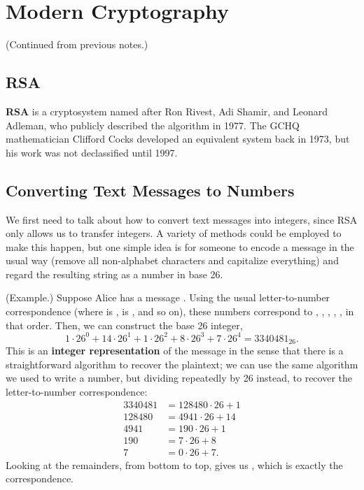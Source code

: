 \documentclass[letterpaper]{article}
\begin{document}
\section{Modern Cryptography}
(Continued from previous notes.)

\subsection{RSA}
\textbf{RSA} is a cryptosystem named after Ron Rivest, Adi Shamir, and Leonard Adleman, who publicly described the algorithm in 1977. The GCHQ mathematician Clifford Cocks developed an equivalent system back in 1973, but his work was not declassified until 1997.

\subsection{Converting Text Messages to Numbers}
We first need to talk about how to convert text messages into integers, since RSA only allows us to transfer integers. A variety of methods could be employed to make this happen, but one simple idea is for someone to encode a message in the usual way (remove all non-alphabet characters and capitalize everything) and regard the resulting string as a number in base 26. 

\begin{mdframed}
    (Example.) Suppose Alice has a message . Using the usual letter-to-number correspondence (where  is ,  is , and so on), these numbers correspond to , , , , , in that order. Then, we can construct the base 26 integer, \[1 \cdot 26^0 + 14 \cdot 26^1 + 1 \cdot 26^2 + 8 \cdot 26^3 + 7 \cdot 26^4 = 3340481_{26}.\]
    This is an \textbf{integer representation} of the message  in the sense that there is a straightforward algorithm to recover the plaintext; we can use the same algorithm we used to write a number, but dividing repeatedly by 26 instead, to recover the letter-to-number correspondence: 
    \begin{equation*}
        \begin{aligned}
            3340481 &= 128480 \cdot 26 + 1 \\ 
            128480 &= 4941 \cdot 26 + 14 \\ 
            4941 &= 190 \cdot 26 + 1 \\ 
            190 &= 7 \cdot 26 + 8 \\ 
            7 &= 0 \cdot 26 + 7.
        \end{aligned}
    \end{equation*}
    Looking at the remainders, from bottom to top, gives us , which is exactly the correspondence.
\end{mdframed}
\end{document}
